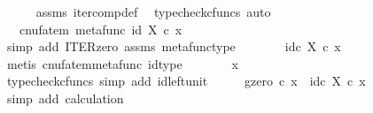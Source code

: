 \begin{isabellebody}
\ \ \ \ \isamarkupfalse%
\ assms\ iter{\isacharunderscore}{\kern0pt}comp{\isacharunderscore}{\kern0pt}def{}\ \isamarkupfalse%
\ {\isacharparenleft}{\kern0pt}typecheck{\isacharunderscore}{\kern0pt}cfuncs{\isacharcomma}{\kern0pt}\ auto{\isacharparenright}{\kern0pt}\isanewline
\ \ \isamarkupfalse%
\ \isamarkupfalse%
\ {\isachardoublequoteopen}{\isachardot}{\kern0pt}{\isachardot}{\kern0pt}{\isachardot}{\kern0pt}\ {\isacharequal}{\kern0pt}\ cnufatem\ {\isacharparenleft}{\kern0pt}metafunc\ {\isacharparenleft}{\kern0pt}id\ X{\isacharparenright}{\kern0pt}{\isacharparenright}{\kern0pt}\ {\isasymcirc}\isactrlsub c\ x{\isachardoublequoteclose}\isanewline
\ \ \ \ \isamarkupfalse%
\ {\isacharparenleft}{\kern0pt}simp\ add{\isacharcolon}{\kern0pt}\ ITER{\isacharunderscore}{\kern0pt}zero{\isacharprime}{\kern0pt}\ assms\ metafunc{\isacharunderscore}{\kern0pt}type{\isacharparenright}{\kern0pt}\isanewline
\ \ \isamarkupfalse%
\ \isamarkupfalse%
\ {\isachardoublequoteopen}{\isachardot}{\kern0pt}{\isachardot}{\kern0pt}{\isachardot}{\kern0pt}\ {\isacharequal}{\kern0pt}\ id\isactrlsub c\ X\ {\isasymcirc}\isactrlsub c\ x{\isachardoublequoteclose}\isanewline
\ \ \ \ \isamarkupfalse%
\ {\isacharparenleft}{\kern0pt}metis\ cnufatem{\isacharunderscore}{\kern0pt}metafunc\ id{\isacharunderscore}{\kern0pt}type{\isacharparenright}{\kern0pt}\isanewline
\ \ \isamarkupfalse%
\ \isamarkupfalse%
\ {\isachardoublequoteopen}{\isachardot}{\kern0pt}{\isachardot}{\kern0pt}{\isachardot}{\kern0pt}\ {\isacharequal}{\kern0pt}\ x{\isachardoublequoteclose}\isanewline
\ \ \ \ \isamarkupfalse%
\ {\isacharparenleft}{\kern0pt}typecheck{\isacharunderscore}{\kern0pt}cfuncs{\isacharcomma}{\kern0pt}\ simp\ add{\isacharcolon}{\kern0pt}\ id{\isacharunderscore}{\kern0pt}left{\isacharunderscore}{\kern0pt}unit{}{\isacharparenright}{\kern0pt}\isanewline
\ \ \isamarkupfalse%
\ \isamarkupfalse%
\ {\isachardoublequoteopen}{\isacharparenleft}{\kern0pt}g\isactrlbsup {\isasymcirc}zero\isactrlesup {\isacharparenright}{\kern0pt}\ {\isasymcirc}\isactrlsub c\ x\ {\isacharequal}{\kern0pt}\ id\isactrlsub c\ X\ {\isasymcirc}\isactrlsub c\ x{\isachardoublequoteclose}\isanewline
\ \ \ \ \isamarkupfalse%
\ {\isacharparenleft}{\kern0pt}simp\ add{\isacharcolon}{\kern0pt}\ calculation{\isacharparenright}{\kern0pt}\isanewline
{}\isamarkupfalse%
%
\endisatagproof
{\isafoldproof}%

\end{isabellebody}
